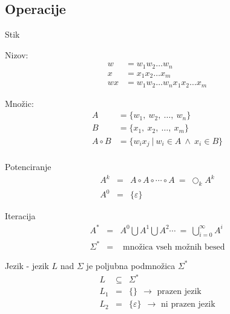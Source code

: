 \documentclass[10pt,a4paper,oneside]{book}
\begin{document}
\subsection*{Operacije}
\begin{items}
\item Stik
	\begin{items}
	\item Nizov: 
		\begin{align*}
		w & = w_1 w_2 \ldots w_n \\ 
		x & = x_1 x_2 \ldots x_m \\ 
		wx & = w_1 w_2 \ldots w_n x_1 x_2 \ldots x_m
		\end{align*} 
	\item Množic:
		\begin{align*} 
		A & = \lbrace w_1 ,\ w_2 ,\ \ldots ,\ w_n \rbrace \\ 
		B & = \lbrace x_1 ,\ x_2 ,\ \ldots ,\ x_m \rbrace \\ 
		A \circ B & = \lbrace w_ix_j \ | \ w_i \in A \ \wedge \ x_i \in B \rbrace \\
		\end{align*} 
	\end{items}
\item Potenciranje
	\begin{eqnarray*} 
	A^k & = & A \circ A \circ \cdots \circ A \ = \ \bigcirc_{k} A^k \\
	A^0 & = & \lbrace \varepsilon \rbrace 
	\end{eqnarray*} 		
\item Iteracija
	\begin{eqnarray*} 
	A^* & = & A^0 \bigcup A^1 \bigcup A^2 \cdots  \ = \ \bigcup_{i=0}^{ \infty } A^i \\
	\Sigma^* & = & \mbox{ množica vseh možnih besed}
	\end{eqnarray*} 		
\item Jezik - jezik $L$ nad $ \Sigma $ je poljubna podmnožica $ \Sigma^* $ 
	\begin{eqnarray*} 
	L & \subseteq & \Sigma^* \\
	L_1 & = & \lbrace \rbrace \ \ \rightarrow \mbox{ prazen jezik} \\
	L_2 & = & \lbrace \varepsilon \rbrace  \ \ \rightarrow \mbox{ ni prazen jezik} 
	\end{eqnarray*} 
\end{items}
\end{document}
